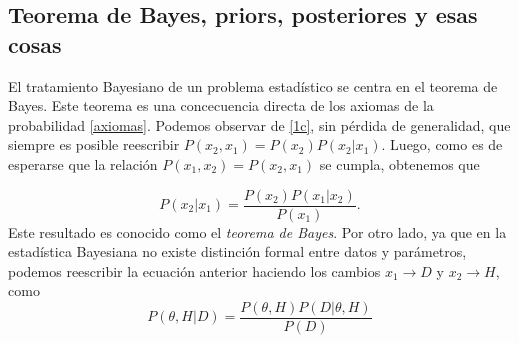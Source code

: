 \documentclass[10.5pt,prb,
               showpacs,            %
               preprintnumbers,     %
               aps,                 %
               prl,          	    %
               letterpaper,             %
               superscriptaddress,      %
               nofootinbib,         %
               tightenlines,        %
               floats,floatfix      %
               ,usenatbib]{revtex4-1}%
\begin{document}




\subsection{Teorema de Bayes, priors, posteriores y esas cosas}

El tratamiento Bayesiano de un problema estad\'istico se centra en el  teorema de Bayes. 
Este teorema es una concecuencia directa de los axiomas de la probabilidad \eqref{axiomas}. 
Podemos observar de \eqref{1c}, sin p\'erdida de generalidad, que siempre es posible reescribir 
$P(x_2,x_1)=P(x_2)P(x_2|x_1)$. Luego, como es de esperarse que la relaci\'on $P(x_1,x_2)=P(x_2,x_1)$ se cumpla, 
obtenemos que

	\begin{equation}
		P(x_2|x_1)=\frac{P(x_2)P(x_1|x_2)}{P(x_1)}.
	\end{equation}
%
Este resultado es conocido como el \textit{teorema de Bayes}. Por otro lado, ya que 
en la estad\'istica Bayesiana no existe distinci\'on formal entre datos y par\'ametros, 
podemos reescribir la ecuaci\'on anterior haciendo los cambios $x_1\rightarrow D$ y $x_2\rightarrow H$, como
%
	\begin{equation}\label{BayesT}
		P(\theta,H|D)=\frac{P(\theta,H)P(D|\theta,H)}{P(D)}
	\end{equation}
\end{document}
